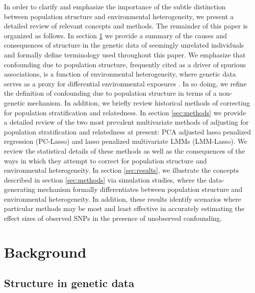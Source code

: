 In order to clarify and emphasize the importance of the subtle distinction between population structure and environmental heterogeneity, we present a detailed review of relevant concepts and methods. The remainder of this paper is organized as follows. In section \ref{sec:background} we provide a summary of the causes and consequences of structure in the genetic data of seemingly unrelated individuals and formally define terminology used throughout this paper. We emphasize that confounding due to population structure, frequently cited as a driver of spurious associations, is a function of environmental heterogeneity, where genetic data serves as a proxy for differential environmental exposures \citep{Sillanpaeae2011, sul2018population, vilhjalmsson2012nature, barton2019population}. In so doing, we refine the definition of confounding due to population structure in terms of a non-genetic mechanism. In addition, we briefly review historical methods of correcting for population stratification and relatedness. In section \ref{sec:methods} we provide a detailed review of the two most prevalent multivariate methods of adjusting for population stratification and relatedness at present: PCA adjusted lasso penalized regression (PC-Lasso) and lasso penalized multivariate LMMs (LMM-Lasso). We review the statistical details of these methods as well as the consequences   of the ways in which they attempt to correct for population structure and environmental heterogeneity. In section \ref{sec:results}, we illustrate the concepts described in section \ref{sec:methods} via simulation studies, where the data-generating mechanism formally differentiates between population structure and environmental heterogeneity. In addition, these results identify scenarios where particular methods may be most and least effective in accurately estimating the effect sizes of observed SNPs in the presence of unobserved confounding.




\section{Background} \label{sec:background}

\subsection{Structure in genetic data}

